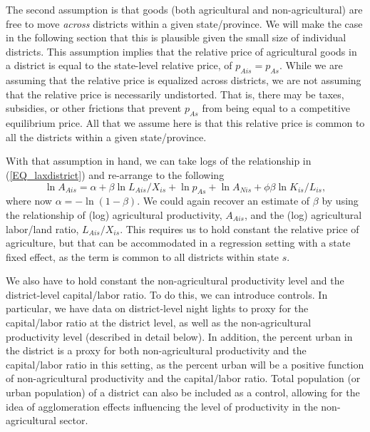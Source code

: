 The second assumption is that goods (both agricultural and non-agricultural) are free to move \textit{across} districts within a given state/province. We will make the case in the following section that this is plausible given the small size of individual districts. This assumption implies that the relative price of agricultural goods in a district is equal to the state-level relative price, of $p_{Ais} = p_{As}$. While we are assuming that the relative price is equalized across districts, we are not assuming that the relative price is necessarily undistorted. That is, there may be taxes, subsidies, or other frictions that prevent $p_{As}$ from being equal to a competitive equilibrium price. All that we assume here is that this relative price is common to all the districts within a given state/province. 

With that assumption in hand, we can take logs of the relationship in (\ref{EQ_laxdistrict}) and re-arrange to the following
\begin{equation}
	\ln A_{Ais} = \alpha + \beta \ln L_{Ais}/X_{is} + \ln p_{As} + \ln A_{Nis} + \phi\beta \ln K_{is}/L_{is},
\end{equation}
where now $\alpha = - \ln (1-\beta)$. We could again recover an estimate of $\beta$ by using the relationship of (log) agricultural productivity, $A_{Ais}$, and the (log) agricultural labor/land ratio, $L_{Ais}/X_{is}$. This requires us to hold constant the relative price of agriculture, but that can be accommodated in a regression setting with a state fixed effect, as the term is common to all districts within state $s$. 

We also have to hold constant the non-agricultural productivity level and the district-level capital/labor ratio. To do this, we can introduce controls. In particular, we have data on district-level night lights to proxy for the capital/labor ratio at the district level, as well as the non-agricultural productivity level (described in detail below). In addition, the percent urban in the district is a proxy for both non-agricultural productivity and the capital/labor ratio in this setting, as the percent urban will be a positive function of non-agricultural productivity and the capital/labor ratio. Total population (or urban population) of a district can also be included as a control, allowing for the idea of agglomeration effects influencing the level of productivity in the non-agricultural sector.



